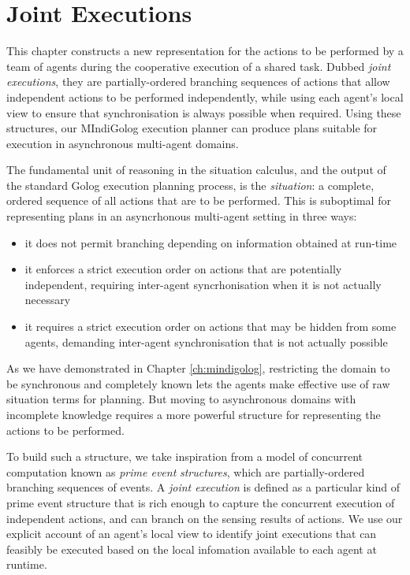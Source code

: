 

\chapter{Joint Executions}

\label{ch:jointexec}

This chapter constructs a new representation for the actions to be
performed by a team of agents during the cooperative execution of
a shared task. Dubbed \emph{joint executions}, they are partially-ordered
branching sequences of actions that allow independent actions to be
performed independently, while using each agent's local view to ensure
that synchronisation is always possible when required. Using these
structures, our MIndiGolog execution planner can produce plans suitable
for execution in asynchronous multi-agent domains.

The fundamental unit of reasoning in the situation calculus, and the
output of the standard Golog execution planning process, is the \emph{situation}:
a complete, ordered sequence of all actions that are to be performed.
This is suboptimal for representing plans in an asyncrhonous multi-agent
setting in three ways:

\begin{itemize}
\item it does not permit branching depending on information obtained at
run-time 
\item it enforces a strict execution order on actions that are potentially
independent, requiring inter-agent syncrhonisation when it is not
actually necessary 
\item it requires a strict execution order on actions that may be hidden
from some agents, demanding inter-agent synchronisation that is not
actually possible 
\end{itemize}
As we have demonstrated in Chapter \ref{ch:mindigolog}, restricting
the domain to be synchronous and completely known lets the agents
make effective use of raw situation terms for planning. But moving
to asynchronous domains with incomplete knowledge requires a more
powerful structure for representing the actions to be performed.

To build such a structure, we take inspiration from a model of concurrent
computation known as \emph{prime event} \emph{structures}, which are
partially-ordered branching sequences of events. A \emph{joint execution}
is defined as a particular kind of prime event structure that is rich
enough to capture the concurrent execution of independent actions,
and can branch on the sensing results of actions. We use our explicit
account of an agent's local view to identify joint executions that
can feasibly be executed based on the local infomation available to
each agent at runtime.

